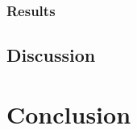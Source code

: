 \documentclass[11pt,twoside]{report}
\theoremstyle{definition}
\numberwithin{theorem}{section}
\numberwithin{definition}{section}
\numberwithin{lemma}{section}
\numberwithin{proposition}{section}
\numberwithin{equation}{section}
\numberwithin{figure}{section}
\begin{document}
\subsection{Results}


\section{Discussion}

\chapter{Conclusion}


\clearpage
\end{document}
